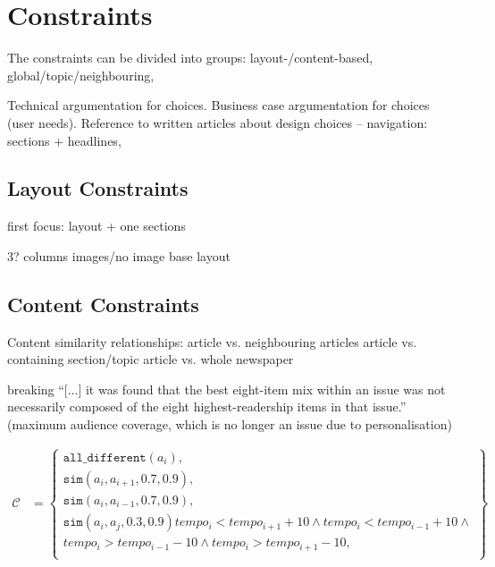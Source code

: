\section{Constraints}
The constraints can be divided into groups: layout-/content-based, global/topic/neighbouring, 


Technical argumentation for choices.
Business case argumentation for choices (user needs).
Reference to written articles about design choices -- navigation: sections + headlines, 

\subsection{Layout Constraints}
first focus: layout + one sections

3? columns
images/no image
base layout



\subsection{Content Constraints}
Content similarity relationships:
article vs. neighbouring articles
article vs. containing section/topic
article vs. whole newspaper

breaking
``[...] it was found that the best eight-item  mix within an issue was not necessarily composed of the eight highest-readership items in that issue.'' \cite{EditorsDilemma} (maximum audience coverage, which is no longer an issue due to personalisation)

\begin{align*}
\mathcal{C} &=	\begin{Bmatrix}
					\texttt{all\_different}(a_i),\\
					\texttt{sim}(a_i, a_{i+1}, 0.7, 0.9), \\
					\texttt{sim}(a_i, a_{i-1}, 0.7, 0.9), \\
					\texttt{sim}(a_i, a_j, 0.3, 0.9)
					tempo_i < tempo_{i+1} + 10 \wedge tempo_i < tempo_{i-1} + 10 \wedge\\
					tempo_i > tempo_{i-1} - 10 \wedge tempo_i > tempo_{i+1} - 10,\\
				\end{Bmatrix}
\end{align*}


